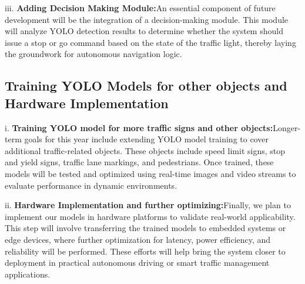 \documentclass[journal,transmag]{IEEEtran}
\begin{document}
iii. \textbf{Adding Decision Making Module:}An essential component of future development will be the integration of a decision-making module. This module will analyze YOLO detection results to determine whether the system should issue a stop or go command based on the state of the traffic light, thereby laying the groundwork for autonomous navigation logic.

\subsection{Training YOLO Models for other objects and Hardware Implementation}

i. \textbf{Training YOLO model for more traffic signs and other objects:}Longer-term goals for this year include extending YOLO model training to cover additional traffic-related objects. These objects include speed limit signs, stop and yield signs, traffic lane markings, and pedestrians. Once trained, these models will be tested and optimized using real-time images and video streams to evaluate performance in dynamic environments.

ii. \textbf{Hardware Implementation and further optimizing:}Finally, we plan to implement our models in hardware platforms to validate real-world applicability. This step will involve transferring the trained models to embedded systems or edge devices, where further optimization for latency, power efficiency, and reliability will be performed. These efforts will help bring the system closer to deployment in practical autonomous driving or smart traffic management applications.






%
\end{document}
